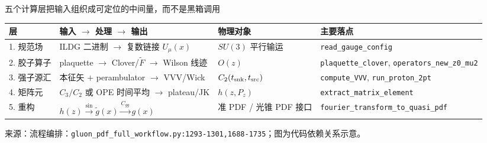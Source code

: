 \documentclass[UTF8,aspectratio=169,11pt]{ctexbeamer}
\newcommand{\source}[1]{%
  \vspace{0.06em}\par{\raggedright\scriptsize\color{muted}来源：#1\par}}
\newcommand{\codepath}[1]{\nolinkurl{#1}}
\begin{document}
\begin{frame}[t]{五个计算层把输入组织成可定位的中间量，而不是黑箱调用}
  \centering
  \small
  \begin{tabularx}{0.96\textwidth}{@{}lYlY@{}}
    \toprule
    层 & 输入 \(\to\) 处理 \(\to\) 输出 & 物理对象 & 主要落点 \\
    . 规范场 & ILDG 二进制 \(\to\) 复数链接 \(U_\mu(x)\) & \(SU(3)\) 平行输运 & \codepath{read_gauge_config} \\
    2. 胶子算子 & plaquette \(\to\) Clover/\(\widetilde F\) \(\to\) Wilson 线迹 & \(O(z)\) & \codepath{plaquette_clover}, \codepath{operators_new_z0_mu2} \\
    3. 强子源汇 & 本征矢 \(+\) perambulator \(\to\) VVV/Wick & \(C_2(t_{\rm snk},t_{\rm src})\) & \codepath{compute_VVV}, \codepath{run_proton_2pt} \\
    4. 矩阵元 & \(C_3/C_2\) 或 OPE 时间平均 \(\to\) plateau/JK & \(h(z,P_z)\) & \codepath{extract_matrix_element} \\
    5. 重构 & \(h(z)\xrightarrow{\sin}\widetilde g(x)\xrightarrow{C_{gg}}g(x)\) & 准 PDF / 光锥 PDF 接口 & \codepath{fourier_transform_to_quasi_pdf} \\
    \bottomrule
  \end{tabularx}
  \vspace{0.22cm}
  \source{流程编排：\codepath{gluon_pdf_full_workflow.py:1293-1301,1688-1735}；图为代码依赖关系示意。}
\end{frame}
\end{document}
